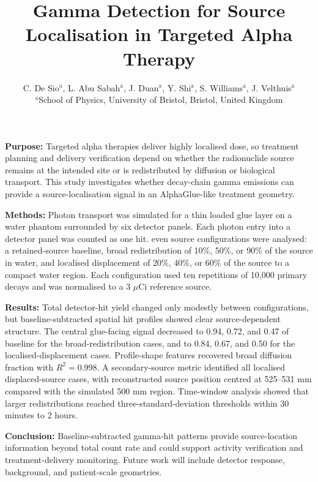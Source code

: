 \documentclass[11pt,a4paper]{article}
\title{Gamma Detection for Source Localisation in Targeted Alpha Therapy}
\author{
C. De Sio$^{\text{a}}$,
L. Abu Sabah$^{\text{a}}$,
J. Duan$^{\text{a}}$,
Y. Shi$^{\text{a}}$,
S. Williams$^{\text{a}}$,
J. Velthuis$^{\text{a}}$\\
\vspace{0.3em}
\small $^{\text{a}}$School of Physics, University of Bristol, Bristol, United Kingdom
}
\date{}
\begin{document}
\maketitle
\sloppy

\textbf{Purpose:} Targeted alpha therapies deliver highly localised dose, so treatment planning and delivery verification depend on whether the radionuclide source remains at the intended site or is redistributed by diffusion or biological transport. 
This study investigates whether decay-chain gamma emissions can provide a source-localisation signal in an AlphaGlue-like treatment geometry.

\textbf{Methods:} Photon transport was simulated for a thin loaded glue layer on a water phantom surrounded by six detector panels. Each photon entry into a detector panel was counted as one hit. 
even source configurations were analysed: a retained-source baseline, broad redistribution of 10\%, 50\%, or 90\% of the source in water, and localised displacement of 20\%, 40\%, or 60\% of the source to a compact water region. 
Each configuration used ten repetitions of 10,000 primary decays and was normalised to a 3 $\mu$Ci reference source.

\textbf{Results:} Total detector-hit yield changed only modestly between configurations, but baseline-subtracted spatial hit profiles showed clear source-dependent structure. 
The central glue-facing signal decreased to 0.94, 0.72, and 0.47 of baseline for the broad-redistribution cases, and to 0.84, 0.67, and 0.50 for the localised-displacement cases. 
Profile-shape features recovered broad diffusion fraction with \(R^2=0.998\). A secondary-source metric identified all localised displaced-source cases, with reconstructed source position centred at 525--531 mm compared with the simulated 500 mm region. Time-window analysis showed that larger redistributions reached three-standard-deviation thresholds within 30 minutes to 2 hours.

\textbf{Conclusion:} Baseline-subtracted gamma-hit patterns provide source-location information beyond total count rate and could support activity verification and treatment-delivery monitoring. 
Future work will include detector response, background, and patient-scale geometries.
\end{document}
